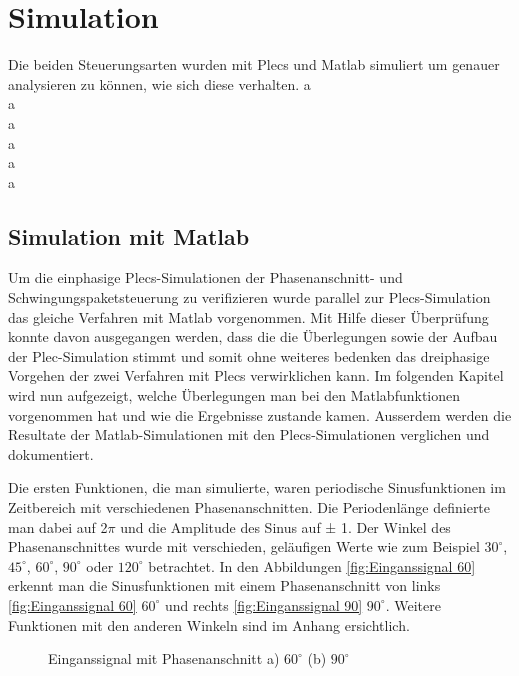\section{Simulation}
Die beiden Steuerungsarten wurden mit Plecs und Matlab simuliert um genauer analysieren zu können, wie sich diese verhalten. 
a\\
a\\
a\\
a\\
a\\
a\\


\subsection{Simulation mit Matlab}
Um die einphasige Plecs-Simulationen der Phasenanschnitt- und Schwingungspaketsteuerung zu verifizieren wurde parallel zur Plecs-Simulation das gleiche Verfahren mit Matlab vorgenommen. Mit Hilfe dieser Überprüfung konnte davon ausgegangen werden, dass die die Überlegungen sowie der Aufbau der Plec-Simulation stimmt und somit ohne weiteres bedenken das dreiphasige Vorgehen der zwei Verfahren mit Plecs verwirklichen kann. Im folgenden Kapitel wird nun aufgezeigt, welche Überlegungen man bei den Matlabfunktionen vorgenommen hat und wie die Ergebnisse zustande kamen. Ausserdem werden die Resultate der Matlab-Simulationen mit den Plecs-Simulationen verglichen und dokumentiert.

Die ersten Funktionen, die man simulierte, waren periodische Sinusfunktionen im Zeitbereich mit verschiedenen Phasenanschnitten. Die Periodenlänge definierte man dabei auf 2$\pi$ und die Amplitude des Sinus auf ± 1. Der Winkel des Phasenanschnittes wurde mit verschieden, geläufigen Werte wie zum Beispiel $30^\circ$, $45^\circ$, $60^\circ$, $90^\circ$ oder $120^\circ$ betrachtet. In den Abbildungen \ref{fig:Einganssignal 60} erkennt man die Sinusfunktionen mit einem Phasenanschnitt von links \ref{fig:Einganssignal 60} $60^\circ$ und rechts \ref{fig:Einganssignal 90} $90^\circ$. Weitere Funktionen mit den anderen Winkeln sind im Anhang ersichtlich.
 

\begin{figure}[h]
	\centering
	\qquad
	\caption{Einganssignal mit Phasenanschnitt a) $60^\circ$ (b) $90^\circ$}
	\label{fig:eingangssignal}
\end{figure} 


